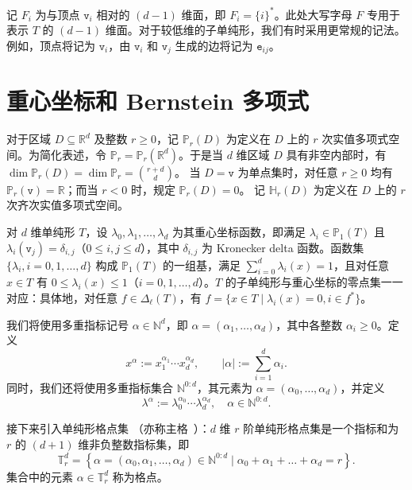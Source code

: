 记 $F_{i}$ 为与顶点 $\texttt{v}_i$ 相对的 $(d-1)$ 维面，即 $F_i = \{i\}^*$。此处大写字母 $F$ 专用于表示 $T$ 的 $(d-1)$ 维面。对于较低维的子单纯形，我们有时采用更常规的记法。例如，顶点将记为 $\texttt{v}_i$，由 $\texttt{v}_i$ 和 $\texttt{v}_j$ 生成的边将记为 $\texttt{e}_{ij}$。






\section{重心坐标和 Bernstein 多项式}
对于区域 $D \subseteq \mathbb{R}^{d}$ 及整数 $r \geqslant 0$，记 $\mathbb{P}_{r}(D)$ 为定义在 $D$ 上的 $r$ 次实值多项式空间。为简化表述，令 $\mathbb{P}_{r}=\mathbb{P}_{r}\left(\mathbb{R}^{d}\right)$。于是当 $d$ 维区域 $D$ 具有非空内部时，有 $\operatorname{dim} \mathbb{P}_{r}(D)=\operatorname{dim} \mathbb{P}_{r}=\displaystyle{r+d \choose d}$。
当 $D = {\texttt{v}}$ 为单点集时，对任意 $r \geqslant 0$ 均有 $\mathbb{P}_{r}(\texttt{v})=\mathbb{R}$；而当 $r<0$ 时，规定 $\mathbb{P}_{r}(D)= {0}$。
记 $\mathbb{H}_{r}(D)$ 为定义在 $D$ 上的 $r$ 次齐次实值多项式空间。

对 $d$ 维单纯形 $T$，设 $\lambda_{0}, \lambda_{1}, \ldots, \lambda_{d}$ 为其重心坐标函数，即满足 $\lambda_{i} \in \mathbb{P}_{1}(T)$ 且 $\lambda_{i}\left(\texttt{v}_j\right)=\delta_{i,j}$（$0 \leqslant i, j \leqslant d$），其中 $\delta_{i,j}$ 为 Kronecker delta 函数。函数集 $\{\lambda_{i}, i=0,1,\ldots, d\}$ 构成 $\mathbb{P}_{1}(T)$ 的一组基，满足 $\sum_{i=0}^d\lambda_i (x)= 1$，且对任意 $x\in T$ 有 $0\leq \lambda_i(x)\leq 1$（$i=0,1,\ldots,d$）。$T$ 的子单纯形与重心坐标的零点集一一对应：具体地，对任意 $f\in \Delta_{\ell}(T)$，有 $f = \{x\in T\mid \lambda_i(x) = 0, i\in f^*\}$。

我们将使用多重指标记号 $\alpha \in \mathbb{N}^{d}$，即 $\alpha=(\alpha_1, \dots, \alpha_d)$，其中各整数 $\alpha_i \ge 0$。定义
\[
x^\alpha := x_1^{\alpha_1} \cdots x_d^{\alpha_d}, \qquad |\alpha| := \sum_{i=1}^d \alpha_i.
\]
同时，我们还将使用多重指标集合 $\mathbb{N}^{0:d}$，其元素为 $\alpha = (\alpha_0, \dots, \alpha_d)$，并定义
\[
\lambda^\alpha := \lambda_0^{\alpha_0} \cdots \lambda_d^{\alpha_d}, \quad \alpha \in \mathbb{N}^{0:d}.
\]

接下来引入单纯形格点集 \cite{Chen;Huang:2022FEMcomplex3D,ChenHuang2021Cmgeodecomp}（亦称主格~\cite{nicolaides1973class}）：$d$ 维 $r$ 阶单纯形格点集是一个指标和为 $r$ 的 $(d+1)$ 维非负整数指标集，即
\[
\mathbb T^{d}_r = \left \{ \alpha = (\alpha_0, \alpha_1, \ldots, \alpha_d)\in\mathbb N^{0:d} \mid \alpha_0 + \alpha_1 + \ldots + \alpha_d = r \right \}.
\]
集合中的元素 $\alpha \in \mathbb{T}^d_r$ 称为格点。

